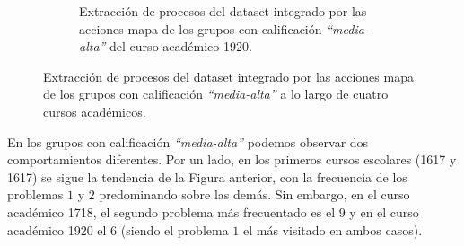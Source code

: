 \begin{figure}[H]
\begin{subfigure}[t]{0.60\textwidth}
    \caption{Extracción de procesos del dataset integrado por las acciones mapa de los grupos con calificación \emph{``media-alta''} del curso académico 1920.}
    \label{fig:mapYear1920MidHighGrades}
  \end{subfigure}
  \caption{Extracción de procesos del dataset integrado por las acciones mapa de los grupos con calificación \emph{``media-alta''} a lo largo de cuatro cursos académicos.}
\end{figure}

En los grupos con calificación \emph{``media-alta''} podemos observar dos comportamientos diferentes. Por un lado, en los primeros cursos escolares (1617 y 1617) se sigue la tendencia de la Figura anterior, con la frecuencia de los problemas $1$ y $2$ predominando sobre las demás. Sin embargo, en el curso académico 1718, el segundo problema más frecuentado es el $9$ y en el curso académico 1920 el $6$ (siendo el problema $1$ el más visitado en ambos casos).

